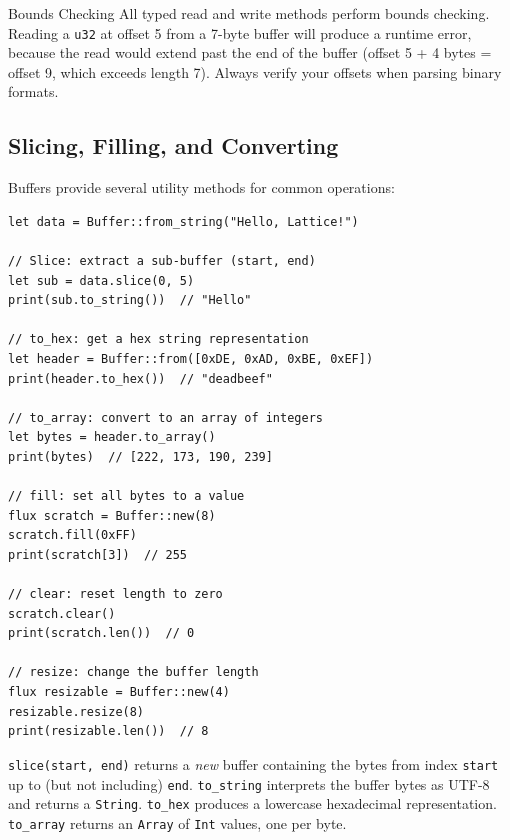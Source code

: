 \begin{warnbox}{Bounds Checking}
All typed read and write methods perform bounds checking. Reading a
\lstinline|u32| at offset 5 from a 7-byte buffer will produce a runtime error,
because the read would extend past the end of the buffer (offset 5 + 4 bytes
= offset 9, which exceeds length 7). Always verify your offsets when parsing
binary formats.
\end{warnbox}

\subsection{Slicing, Filling, and Converting}\label{sec:buffer-utility}


Buffers provide several utility methods for common operations:

\begin{lstlisting}[language=Lattice, caption={Buffer utility methods}]
let data = Buffer::from_string("Hello, Lattice!")

// Slice: extract a sub-buffer (start, end)
let sub = data.slice(0, 5)
print(sub.to_string())  // "Hello"

// to_hex: get a hex string representation
let header = Buffer::from([0xDE, 0xAD, 0xBE, 0xEF])
print(header.to_hex())  // "deadbeef"

// to_array: convert to an array of integers
let bytes = header.to_array()
print(bytes)  // [222, 173, 190, 239]

// fill: set all bytes to a value
flux scratch = Buffer::new(8)
scratch.fill(0xFF)
print(scratch[3])  // 255

// clear: reset length to zero
scratch.clear()
print(scratch.len())  // 0

// resize: change the buffer length
flux resizable = Buffer::new(4)
resizable.resize(8)
print(resizable.len())  // 8
\end{lstlisting}

\lstinline|slice(start, end)| returns a \emph{new} buffer containing the
bytes from index \texttt{start} up to (but not including) \texttt{end}.
\lstinline|to_string| interprets the buffer bytes as UTF-8 and returns a
\lstinline|String|. \lstinline|to_hex| produces a lowercase hexadecimal
representation. \lstinline|to_array| returns an \lstinline|Array| of
\lstinline|Int| values, one per byte.

